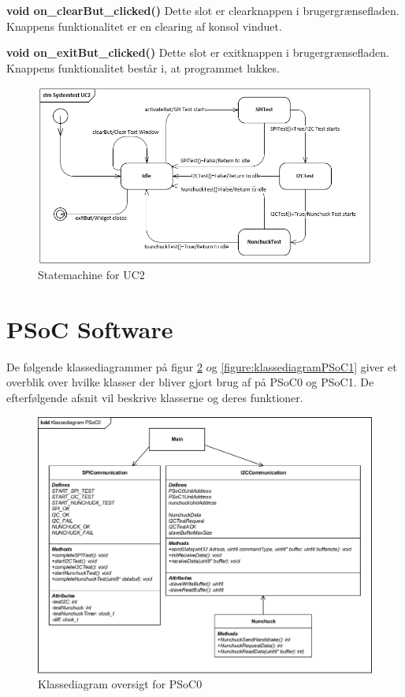 \noindent\textbf{void on\_clearBut\_clicked()} \newline
Dette slot er clearknappen i brugergrænsefladen. Knappens funktionalitet er en clearing af konsol vinduet. \newline

\noindent\textbf{void on\_exitBut\_clicked()} \newline
Dette slot er exitknappen i brugergrænsefladen. Knappens funktionalitet består i, at programmet lukkes.

\begin{figure}[H]
	\centering
	\includegraphics[width=\textwidth]{DesignOgImplementering/images/StateMachineGUIUC2}
	\caption{Statemachine for UC2}
	\label{fig:stmGUI}
\end{figure}



\section{PSoC Software}

De følgende klassediagrammer på figur \ref{figure:klassediagramPSoC0} og \ref{figure:klassediagramPSoC1} giver et overblik over hvilke klasser der bliver gjort brug af på PSoC0 og PSoC1. De efterfølgende afsnit vil beskrive klasserne og deres funktioner.

\begin{figure}[H]
	\centering
	\includegraphics[width=.7\textwidth]{DesignOgImplementering/images/PSoC0KlassediagramOversigt}
	\caption{Klassediagram oversigt for PSoC0}
	\label{figure:klassediagramPSoC0}
\end{figure}

